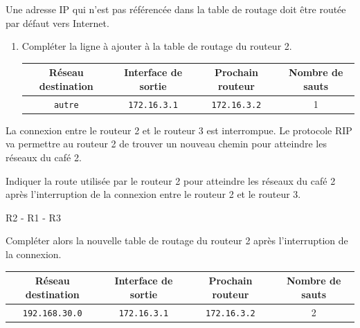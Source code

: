 \documentclass[11pt, a4paper]{report}
\renewcommand{\arraystretch}{1}  %
\begin{document}
Une adresse IP qui n'est pas référencée dans la table de routage doit être routée par défaut vers Internet.

\begin{enumerate}[resume]
    \item Compléter la ligne à ajouter à la table de routage du routeur 2.
    
    \renewcommand{\arraystretch}{1.5}
\begin{center}
    \begin{tabular}{|c|c|c|c|}
        \hline
        \textbf{Réseau destination} & \textbf{Interface de sortie} & \textbf{Prochain routeur} & \textbf{Nombre de sauts}\\
        \hline
        \verb|autre| & \verb|172.16.3.1| & \verb|172.16.3.2| & 1 \\  \hline
           \end{tabular}
\end{center}
\end{enumerate}

\medskip

La connexion entre le routeur 2 et le routeur 3 est interrompue. Le protocole RIP va permettre au routeur 2 de trouver un nouveau chemin pour atteindre les réseaux du café 2.

\begin{enumerate}[resume]
    
    \begin{minipage}{0.71\linewidth}
    \item Indiquer la route utilisée par le routeur 2 pour atteindre les réseaux du café 2 après l'interruption de la connexion entre le routeur 2 et le routeur 3.
\end{minipage}\hfill
    \begin{minipage}{0.28\linewidth}
        \begin{blocvisible}[height=1]
            R2 - R1 - R3
            \end{blocvisible}
\end{minipage}
    \item Compléter alors la nouvelle table de routage du routeur 2 après l'interruption de la connexion.
\renewcommand{\arraystretch}{1.5}
\begin{center}
    \begin{tabular}{|c|c|c|c|}
        \hline
        \textbf{Réseau destination} & \textbf{Interface de sortie} & \textbf{Prochain routeur} & \textbf{Nombre de sauts}\\
         
        \hline
        \verb|192.168.30.0| & \verb|172.16.3.1| & \verb|172.16.3.2| & 2 \\ \hline
           \end{tabular}
\end{center}    

\end{enumerate}
\end{document}
